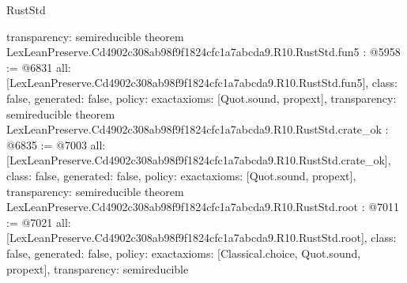 \begin{lexlean}{RustStd}
\begin{coremodule}
{  transparency: semireducible
}
theorem LexLeanPreserve.Cd4902c308ab98f9f1824cfc1a7abcda9.R10.RustStd.fun5 : @5958 := @6831 {
  all: [LexLeanPreserve.Cd4902c308ab98f9f1824cfc1a7abcda9.R10.RustStd.fun5],
  class: false,
  generated: false,
  policy: exact{axioms: [Quot.sound, propext]},
  transparency: semireducible
}
theorem LexLeanPreserve.Cd4902c308ab98f9f1824cfc1a7abcda9.R10.RustStd.crate_ok : @6835 := @7003 {
  all: [LexLeanPreserve.Cd4902c308ab98f9f1824cfc1a7abcda9.R10.RustStd.crate_ok],
  class: false,
  generated: false,
  policy: exact{axioms: [Quot.sound, propext]},
  transparency: semireducible
}
theorem LexLeanPreserve.Cd4902c308ab98f9f1824cfc1a7abcda9.R10.RustStd.root : @7011 := @7021 {
  all: [LexLeanPreserve.Cd4902c308ab98f9f1824cfc1a7abcda9.R10.RustStd.root],
  class: false,
  generated: false,
  policy: exact{axioms: [Classical.choice, Quot.sound, propext]},
  transparency: semireducible
}


\end{coremodule}
\end{lexlean}
